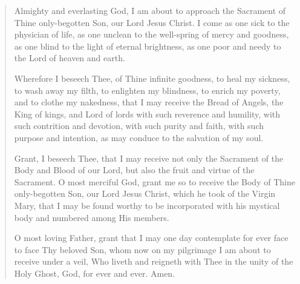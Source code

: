 \begin{quote}


Almighty and everlasting God, I am about to approach the Sacrament of Thine only-begotten Son, our Lord Jesus Christ. I
come as one sick to the physician of life, as one unclean to the well-spring of mercy and goodness, as one blind to
the light of eternal brightness, as one poor and needy to the Lord of heaven and earth. 

Wherefore I beseech Thee, of Thine
infinite goodness, to heal my sickness, to wash away my filth, to enlighten my blindness, to enrich my poverty, and to clothe
my nakedness, that I may receive the Bread of Angels, the King of kings, and Lord of lords with such reverence and humility,
with such contrition and devotion, with such purity and faith, with such purpose and intention, as may conduce to the salvation
of my soul. 

Grant, I beseech Thee, that I may receive not only the Sacrament of the Body and Blood of our Lord, but also the
fruit and virtue of the Sacrament. O most merciful God, grant me so to receive the Body of Thine only-begotten
Son, our Lord Jesus Christ, which he took of the Virgin Mary, that I may be found worthy to be incorporated with his mystical
body and numbered among His members. 

O most loving Father, grant that I may one day contemplate for ever face to face Thy
beloved Son, whom now on my pilgrimage I am about to receive under a veil, Who liveth and reigneth with Thee in the unity of
the Holy Ghost, God, for ever and ever. Amen.





\end{quote}

\eject
